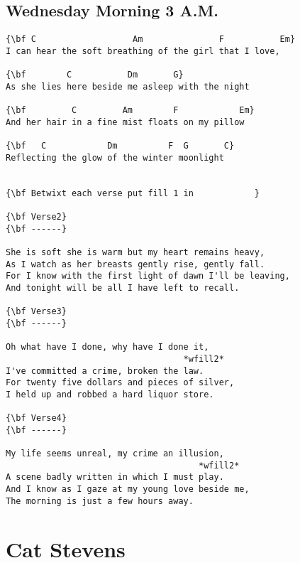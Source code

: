 \documentclass[a4paper]{article}
\begin{document}
\subsection{Wednesday Morning 3 A.M.} %
\label{sub:Wednesday Morning 3 A.M.}
\begin{Verbatim}[commandchars=\\\{\}]
{\bf C                   Am               F           Em}
I can hear the soft breathing of the girl that I love,

{\bf        C           Dm       G}
As she lies here beside me asleep with the night

{\bf         C         Am        F            Em}
And her hair in a fine mist floats on my pillow

{\bf   C            Dm          F  G       C}
Reflecting the glow of the winter moonlight


{\bf Betwixt each verse put fill 1 in            }

{\bf Verse2}
{\bf ------}

She is soft she is warm but my heart remains heavy,
As I watch as her breasts gently rise, gently fall.
For I know with the first light of dawn I'll be leaving,
And tonight will be all I have left to recall.

{\bf Verse3}
{\bf ------}

Oh what have I done, why have I done it,
                                   *wfill2*
I've committed a crime, broken the law.
For twenty five dollars and pieces of silver,
I held up and robbed a hard liquor store.

{\bf Verse4}
{\bf ------}

My life seems unreal, my crime an illusion,
                                      *wfill2*
A scene badly written in which I must play.
And I know as I gaze at my young love beside me,
The morning is just a few hours away.
\end{Verbatim}
\newpage
\section{Cat Stevens} %
\label{sec:Cat Stevens}
\end{document}
